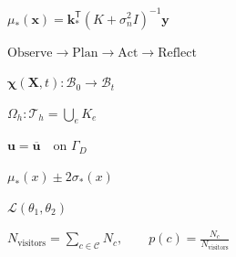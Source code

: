 \documentclass[12pt]{article}
\begin{document}
\begin{preview}
  \color{chalkblue}$\displaystyle
  \mu_{*}(\bm{x})
  =\bm{k}_{*}^{\mathsf T}(K+\sigma_n^2I)^{-1}\bm{y}$
\end{preview}

\begin{preview}
  \color{chalkgold}$\displaystyle
  \mathrm{Observe}\longrightarrow\mathrm{Plan}
  \longrightarrow\mathrm{Act}\longrightarrow\mathrm{Reflect}$
\end{preview}

\begin{preview}
  \color{chalkblue}$\displaystyle
  \bm{\chi}(\bm{X},t):\mathcal{B}_0\longrightarrow\mathcal{B}_t$
\end{preview}

\begin{preview}
  \color{chalk}$\displaystyle
  \Omega_h:\mathcal{T}_h=\bigcup_e K_e$
\end{preview}

\begin{preview}
  \color{chalk}$\displaystyle
  \bm{u}=\overline{\bm{u}}\quad\text{on }\Gamma_D$
\end{preview}

\begin{preview}
  \color{chalkblue}$\displaystyle
  \mu_*(x)\pm2\sigma_*(x)$
\end{preview}

\begin{preview}
  \color{chalk}$\displaystyle
  \mathcal{L}(\theta_1,\theta_2)$
\end{preview}

\begin{preview}
  \color{chalk}{\Huge\bfseries Bhavesh}
\end{preview}

\begin{preview}
  \color{dashboardink}$\displaystyle
  N_{\mathrm{visitors}}=\sum_{c\in\mathcal{C}}N_c,
  \qquad p(c)=\frac{N_c}{N_{\mathrm{visitors}}}$
\end{preview}
\end{document}
